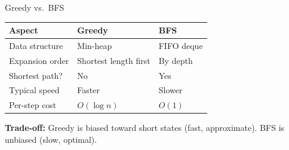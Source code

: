 \documentclass[aspectratio=169,11pt]{beamer}
\begin{document}
\begin{frame}{Greedy vs.\ BFS}
  \begin{center}
  \begin{tabular}{lll}
    \toprule
    \textbf{Aspect} & \textbf{Greedy} & \textbf{BFS} \\
    \midrule
    Data structure   & Min-heap          & FIFO deque \\
    Expansion order  & Shortest length first & By depth \\
    Shortest path?   & \textcolor{bad}{No}  & \textcolor{good}{Yes} \\
    Typical speed    & \textcolor{good}{Faster} & Slower \\
    Per-step cost    & $O(\log n)$       & $O(1)$ \\
    \bottomrule
  \end{tabular}
  \end{center}

  \bigskip
  \textbf{Trade-off:} Greedy is biased toward short states (fast, approximate).
  BFS is unbiased (slow, optimal).
\end{frame}
\end{document}
